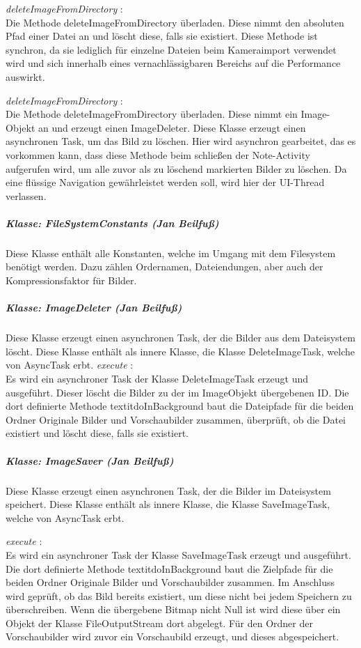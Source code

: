 \textit{ deleteImageFromDirectory }:\\
Die Methode deleteImageFromDirectory überladen. Diese nimmt den absoluten Pfad einer Datei an und löscht diese, falls sie existiert. Diese Methode ist synchron, da sie lediglich für einzelne Dateien beim Kameraimport verwendet wird und sich innerhalb eines vernachlässigbaren Bereichs auf die Performance auswirkt.

\textit{ deleteImageFromDirectory }:\\
Die Methode deleteImageFromDirectory überladen. Diese nimmt ein Image-Objekt an und erzeugt einen ImageDeleter. Diese Klasse erzeugt einen asynchronen Task, um das Bild zu löschen. Hier wird asynchron gearbeitet, das es vorkommen kann, dass diese Methode beim schließen der Note-Activity aufgerufen wird, um alle zuvor als zu löschend markierten Bilder zu löschen. Da eine flüssige Navigation gewährleistet werden soll, wird hier der UI-Thread verlassen.

\subparagraph{Klasse: FileSystemConstants (Jan Beilfuß)}
Diese Klasse enthält alle Konstanten, welche im Umgang mit dem Filesystem benötigt werden. Dazu zählen Ordernamen, Dateiendungen, aber auch der Kompressionsfaktor für Bilder.

\subparagraph{Klasse: ImageDeleter (Jan Beilfuß)}
Diese Klasse erzeugt einen asynchronen Task, der die Bilder aus dem Dateisystem löscht. Diese Klasse enthält als innere Klasse, die Klasse DeleteImageTask, welche von AsyncTask erbt.
\textit{ execute }:\\
Es wird ein asynchroner Task der Klasse DeleteImageTask erzeugt und ausgeführt. Dieser löscht die Bilder zu der im ImageObjekt übergebenen ID. Die dort definierte Methode textit{doInBackground} baut die Dateipfade für die beiden Ordner Originale Bilder und Vorschaubilder zusammen, überprüft, ob die Datei existiert und löscht diese, falls sie existiert.

\subparagraph{Klasse: ImageSaver (Jan Beilfuß)}
Diese Klasse erzeugt einen asynchronen Task, der die Bilder im Dateisystem speichert. Diese Klasse enthält als innere Klasse, die Klasse SaveImageTask, welche von AsyncTask erbt.

\textit{ execute }:\\
Es wird ein asynchroner Task der Klasse SaveImageTask erzeugt und ausgeführt. Die dort definierte Methode textit{doInBackground} baut die Zielpfade für die beiden Ordner Originale Bilder und Vorschaubilder zusammen. Im Anschluss wird geprüft, ob das Bild bereits existiert, um diese nicht bei jedem Speichern zu überschreiben. Wenn die übergebene Bitmap nicht Null ist wird diese über ein Objekt der Klasse FileOutputStream dort abgelegt. Für den Ordner der Vorschaubilder wird zuvor ein Vorschaubild erzeugt, und dieses abgespeichert.

